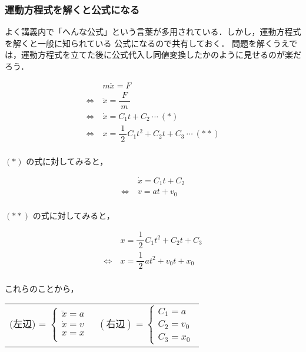 \documentclass[a4paper,11pt]{ltjsarticle}
\begin{document}
\clearpage

\subsubsection{運動方程式を解くと公式になる}


よく講義内で「へんな公式」という言葉が多用されている．しかし，運動方程式を解くと一般に知られている
公式になるので共有しておく．
問題を解くうえでは，運動方程式を立てた後に公式代入し同値変換したかのように見せるのが楽だろう．

\begin{equation*}
  \begin{aligned}
                    &\ m \ddot{x} = F \\
    \Leftrightarrow &\ \ddot{x} = \dfrac{F}{\ m\ } \\
    \Leftrightarrow &\ \dot{x} = C_{1}t + C_{2}\ \cdots\ (\ast) \\
    \Leftrightarrow &\ x = \dfrac{1}{\ 2\ }C_{1}t^{2} + C_{2}t + C_{3}\ \cdots\ (\ast \ast) \\
  \end{aligned}
\end{equation*}

$(\ast)$ の式に対してみると，

\begin{equation*}
  \begin{aligned}
                    &\ \dot{x} = C_{1}t + C_{2}\\
    \Leftrightarrow &\ v = at + v_{0}\\
  \end{aligned}
\end{equation*}

$(\ast \ast)$ の式に対してみると，

\begin{equation*}
  \begin{aligned}
                    &\ x = \dfrac{1}{\ 2\ }C_{1}t^{2} + C_{2}t + C_{3} \\
    \Leftrightarrow &\ x = \dfrac{1}{\ 2\ }at^{2} + v_{0}t + x_{0} \\
  \end{aligned}
\end{equation*}

これらのことから，

\begin{table}[hb]
  \centering
  \begin{tabular}{cc}
    (左辺) =
    $
    \begin{cases}
      \ddot{x} = a \\
      \dot{x} = v \\
      x = x \\
    \end{cases}
    $
    &
    $
    (右辺) =
    \begin{cases}
      C_{1} = a \\
      C_{2} = v_{0} \\
      C_{3} = x_{0}
    \end{cases}
    $
  \end{tabular}
\end{table}
\end{document}
